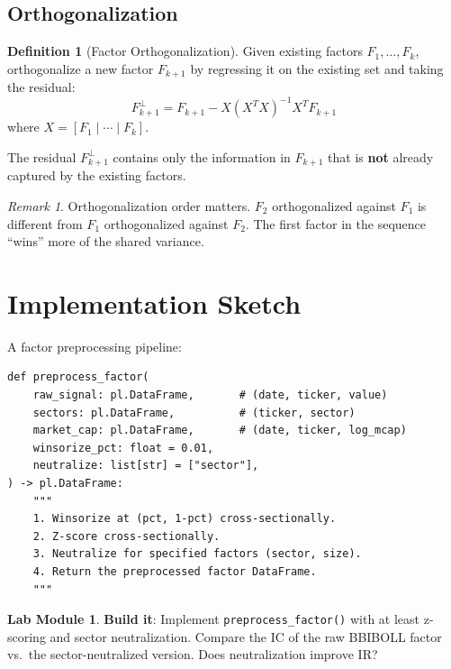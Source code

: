 \documentclass[a4paper, 11pt]{report}
\theoremstyle{definition}
\newtheorem{definition}{Definition}[chapter]
\newtheorem{labmod}{Lab Module}[chapter]
\theoremstyle{remark}
\newtheorem{remark}{Remark}[chapter]
\begin{document}
\subsection{Orthogonalization}

\begin{definition}[Factor Orthogonalization]
    Given existing factors $F_1, \ldots, F_k$, orthogonalize a new factor
    $F_{k+1}$ by regressing it on the existing set and taking the residual:
    \[
        F_{k+1}^{\perp} = F_{k+1} - X(X^TX)^{-1}X^T F_{k+1}
    \]
    where $X = [F_1 \mid \cdots \mid F_k]$.

    The residual $F_{k+1}^{\perp}$ contains only the information in $F_{k+1}$
    that is \textbf{not} already captured by the existing factors.
\end{definition}

\begin{remark}
    Orthogonalization order matters.  $F_2$ orthogonalized against $F_1$ is
    different from $F_1$ orthogonalized against $F_2$.  The first factor in
    the sequence ``wins'' more of the shared variance.
\end{remark}

\section{Implementation Sketch}

A factor preprocessing pipeline:

\begin{lstlisting}
def preprocess_factor(
    raw_signal: pl.DataFrame,       # (date, ticker, value)
    sectors: pl.DataFrame,          # (ticker, sector)
    market_cap: pl.DataFrame,       # (date, ticker, log_mcap)
    winsorize_pct: float = 0.01,
    neutralize: list[str] = ["sector"],
) -> pl.DataFrame:
    """
    1. Winsorize at (pct, 1-pct) cross-sectionally.
    2. Z-score cross-sectionally.
    3. Neutralize for specified factors (sector, size).
    4. Return the preprocessed factor DataFrame.
    """
\end{lstlisting}

\begin{labmod}
    \textbf{Build it}: Implement \texttt{preprocess\_factor()} with at least
    z-scoring and sector neutralization.  Compare the IC of the raw BBIBOLL
    factor vs.\ the sector-neutralized version.  Does neutralization improve
    IR?
\end{labmod}
\end{document}
